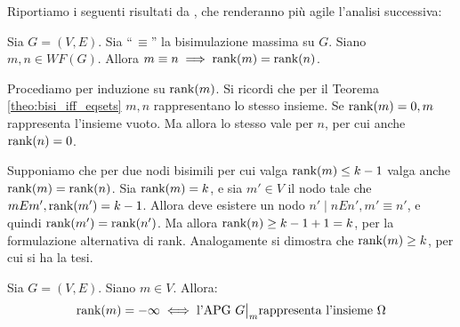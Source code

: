 Riportiamo i seguenti risultati da \cite{dovier}, che renderanno più agile l'analisi successiva:
\begin{proposition} \label{prop:rank_bisi_imp_wf}
    Sia $G = (V,E)$. Sia ``\,$\equiv$'' la bisimulazione massima su $G$. Siano $m,n \in WF(G)$. Allora $m \equiv n \implies \textup{rank}(m) = \textup{rank}(n)$.
\end{proposition}
\begin{proof2}
    Procediamo per induzione su $\textup{rank}(m)$. Si ricordi che per il Teorema \ref{theo:bisi_iff_eqsets} $m,n$ rappresentano lo stesso insieme. Se $\textup{rank}(m) = 0, m$ rappresenta l'insieme vuoto. Ma allora lo stesso vale per $n$, per cui anche $\textup{rank}(n) = 0$.

    Supponiamo che per due nodi bisimili per cui valga $\textup{rank}(m) \leq k-1$ valga anche $\textup{rank}(m) = \textup{rank}(n)$. Sia $\textup{rank}(m) = k$, e sia $m' \in V$ il nodo tale che $m E m', \textup{rank}(m') = k-1$. Allora deve esistere un nodo $n' \mid n E n', m' \equiv n'$, e quindi $\textup{rank}(m') = \textup{rank}(n')$. Ma allora $\textup{rank}(n) \geq k-1 + 1 = k$, per la formulazione alternativa di rank. Analogamente si dimostra che $\textup{rank}(m) \geq k$, per cui si ha la tesi.
\end{proof2}
\begin{proposition}
    \label{prop:omega_rank}
    Sia $G = (V,E)$. Siano $m \in V$. Allora:
    \begin{gather*}
        \rankfunc(m) = -\infty \iff \text{l'APG } \restr{G}{m} \text{rappresenta l'insieme } \Omega
    \end{gather*}
\end{proposition}
